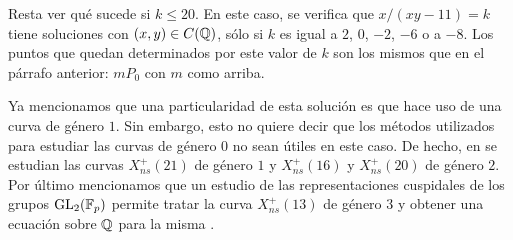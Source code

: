 Resta ver qu\'{e} sucede si $k\leq 20$. En este caso, se verifica que
$x/(xy-11)=k$ tiene soluciones con $(x,y)\in C(\mathbb{Q})$, s\'{o}lo si
$k$ es igual a $2$, $0$, $-2$, $-6$ o a $-8$. Los puntos que quedan
determinados por este valor de $k$ son los mismos que en el p\'{a}rrafo
anterior: $mP_{0}$ con $m$ como arriba.

\begin{obsGenUno}\label{thm:obsGenUno}
 Ya mencionamos que una particularidad de esta soluci\'{o}n es que %
 hace uso de una curva de g\'{e}nero $1$. Sin embargo, esto no quiere decir %
 que los m\'{e}todos utilizados para estudiar las curvas de g\'{e}nero $0$
 no sean \'{u}tiles en este caso.
 De hecho, en \cite{baranNormalizers} se
 estudian las curvas $X_{ns}^{+}(21)$ de g\'{e}nero $1$ y
 $X_{ns}^{+}(16)$ y $X_{ns}^{+}(20)$ de g\'{e}nero $2$.
 Por \'{u}ltimo mencionamos que un estudio de las representaciones cuspidales
 de los grupos $\mathrm{GL}_{2}(\mathbb{F}_{p})$ permite tratar la curva
 $X_{ns}^{+}(13)$ de g\'{e}nero $3$ y obtener una ecuaci\'{o}n sobre $\mathbb{Q}$
 para la misma \cite{baranAnExceptionalIso}.

\end{obsGenUno}

